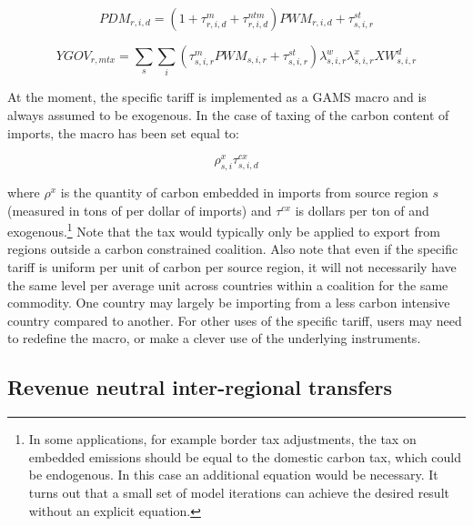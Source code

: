 \documentclass[11pt,letterpaper]{report}
\begin{document}
\begin{equation}
\label{eq:pdmbis}
\mathit{PDM}_{r,i,d} = \left( 1 + \tau^m_{r,i,d}  + \tau^{\mathit{ntm}}_{r,i,d} \right) \mathit{PWM}_{r,i,d}
+ \tau^{\mathit{st}}_{s,i,r}
\end{equation}

\begin{equation}
\label{eq:ygovmtxbis}
\mathit{YGOV}_{r,mtx} =
   \sum_\mathit{s} {\sum_i{\left(
      \tau^m_{s,i,r} \mathit{PWM}_{s,i,r}
      + \tau^{\mathit{st}}_{s,i,r} \right)
         \lambda^w_{s,i,r} \lambda^x_{s,i,r} \mathit{XW}^d_{s,i,r}
   }}
\end{equation}

At the moment, the specific tariff is implemented as a GAMS
macro and is always assumed to be exogenous. In the case of taxing
of the carbon content of imports, the macro has been set
equal to:

\[
\rho^x_{s,i} \tau^{\mathit{cx}}_{s,i,d}
\]

\noindent where $\rho^x$ is the quantity of carbon embedded
in imports from source region $s$ (measured in tons of \COT{}
per dollar of imports) and $\tau^{\mathit{cx}}$ is dollars
per ton of \COT{} and exogenous.\footnote{In some applications,
for example border tax adjustments, the tax on embedded emissions
should be equal to the domestic carbon tax, which could be
endogenous. In this case an additional equation would be necessary.
It turns out that a small set of model iterations can achieve the
desired result without an explicit equation.} Note that
the tax would typically only be applied to export from regions outside a carbon constrained coalition. Also note that even if
the specific tariff is uniform per unit of carbon per source region, it will not necessarily have the same level per average unit across countries
within a coalition for the same commodity. One country may
largely be importing from a less carbon intensive country compared
to another. For other uses of the specific tariff, users
may need to redefine the macro, or make a clever use of
the underlying instruments.

\subsection{Revenue neutral inter-regional transfers}
\end{document}
